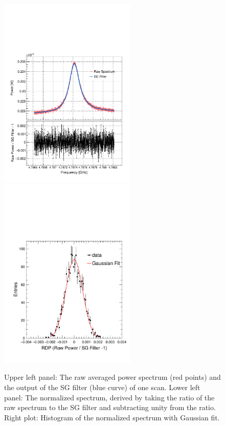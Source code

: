 \begin{figure} [htbp]
  \centering
  \includegraphics[width=6.5cm]{figures/RawPower_SGPower_Ratio_vs_Freq_Step_0100.pdf}
  \includegraphics[width=6.5cm]{figures/Histogram_RawPower_SGPower_Ratio_Step_0100.pdf}
  \caption{Upper left panel: The raw averaged power spectrum (red points) and the 
output of the SG filter (blue curve) of one scan. Lower left panel: The normalized 
spectrum,  derived by taking the ratio of the raw spectrum to the SG filter 
and subtracting unity from the ratio. Right plot: Histogram of the normalized spectrum with Gaussian fit.}
  \label{fig:raw_sg_power}
\end{figure}

